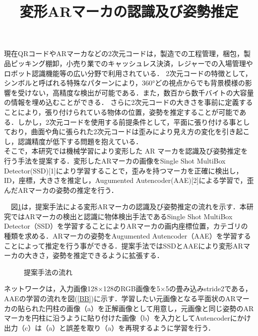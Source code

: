\documentclass{jsarticle}
\title{変形ARマーカの認識及び姿勢推定}
\begin{document}
\maketitle

現在QRコードやARマーカなどの2次元コードは，製造での工程管理，梱包，製品ピッキング棚卸，小売り業でのキャッシュレス決済，レジャーでの入場管理やロボット認識機能等の広い分野で利用されている．
2次元コードの特徴として，シンボルと呼ばれる特殊なパターンにより，360°どの視点からでも背景模様の影響を受けない，高精度な検出が可能である．また，数百から数千バイトの大容量の情報を埋め込むことができる．
さらに2次元コードの大きさを事前に定義することにより，張り付けられている物体の位置，姿勢を推定することが可能である．しかし，2次元コードを使用する前提条件として，平面に張り付ける事としており，曲面や角に張られた2次元コードは歪みにより見え方の変化を引き起こし，認識精度が低下する問題を抱えている．
\\そこで，本研究では機械学習により変形した AR マーカを認識及び姿勢推定を行う手法を提案する．変形したARマーカの画像をSingle Shot MultiBox Detector(SSD)[1]により学習することで，歪みを持つマーカを正確に検出し，ID，座標，大きさを推定し，Augumented Autencoder(AAE)[2]による学習で，歪んだARマーカの姿勢の推定を行う．


　図\ref{flow}は，提案手法による変形ARマーカの認識及び姿勢推定の流れを示す．本研究ではARマーカの検出と認識に物体検出手法であるSingle Shot MultiBox Detector（SSD）を学習することによりARマーカの画内座標位置，カテゴリの種類を求める．ARマーカの姿勢をAugumented Autencoder（AAE）を学習することによって推定を行う事ができる．提案手法ではSSDとAAEにより変形ARマーカの大きさ，姿勢を推定できるように拡張する．

\begin{figure}[ht]
\vspace{-4zh}
\setlength{\epsfxsize}{7.5cm}
\centerline{}
\vspace{3zh}
\caption{提案手法の流れ}
\label{flow}
\vspace{-1.0zh}
\end{figure}

ネットワークは，入力画像128$\times$128のRGB画像を5$\times$5の畳み込みstride2である，
AAEの学習の流れを図(\ref{BB})に示す．学習したい元画像となる平面状のARマーカの貼られた円柱の画像（a）を正解画像として用意し，元画像と同じ姿勢のARマーカを円柱に沿うように貼り付けた画像（b）を入力としてAutencoderにかけ出力（c）は（a）と誤差を取り（a）を再現するように学習を行う．
\end{document}

